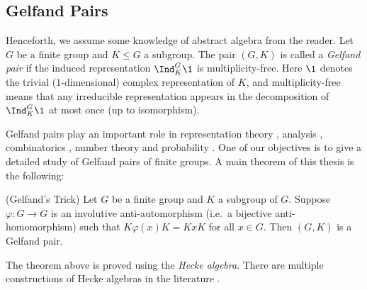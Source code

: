 
\subsection*{Gelfand Pairs}
Henceforth, we assume some knowledge of abstract algebra from the reader.
Let $G$ be a finite group and $K\leq G$ a subgroup.
The pair $(G,K)$ is called a \emph{Gelfand pair} if the induced representation $\Ind_K^G \1$ is multiplicity-free.
Here $\1$ denotes the trivial ($1$-dimensional) complex representation of $K$, and multiplicity-free means that any irreducible representation appears in the decomposition of $\Ind_K^G \1$ at most once (up to isomorphism).

Gelfand pairs play an important role in representation theory \cites{Musili93}, analysis \cites{Koranyi80,Morel18}, combinatorics \cite{Bannai84}, number theory \cites{Gross91, Terras99} and probability \cites{CSST20, Diaconis88}.
One of our objectives is to give a detailed study of Gelfand pairs of finite groups.
A main theorem of this thesis is the following:
\begin{thm}(Gelfand's Trick)\label{theorem: Gelfands_Trick_intro}
	Let $G$ be a finite group and $K$ a subgroup of $G$.
	Suppose $\varphi\colon G\to G$ is an involutive anti-automorphism (i.e.\ a bijective anti-homomorphism) such that $K\varphi(x)K=KxK$ for all $x\in G$.
	Then $(G,K)$ is a Gelfand pair.
\end{thm}
The theorem above is proved using the \emph{Hecke algebra}.
There are multiple constructions of Hecke algebras in the  literature \cites{CMHL03,CSST20}.


